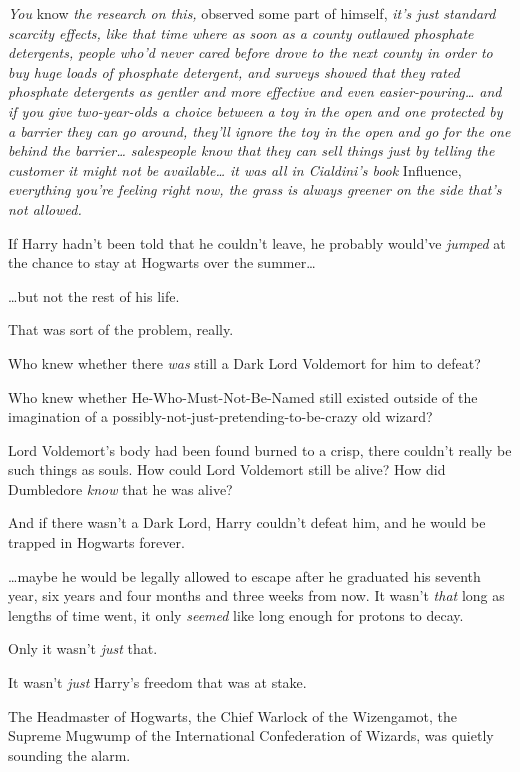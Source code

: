 \emph{You} know \emph{the research on this,} observed some part of himself, 
\emph{it's just standard scarcity effects, like that time where as soon as a 
county outlawed phosphate detergents, people who'd never cared before drove to 
the next county in order to buy huge loads of phosphate detergent, and surveys 
showed that they rated phosphate detergents as gentler and more effective and 
even easier-pouring{\ldots} and if you give two-year-olds a choice between a 
toy in the open and one protected by a barrier they can go around, they'll 
ignore the toy in the open and go for the one behind the barrier{\ldots} 
salespeople know that they can sell things just by telling the customer it 
might not be available{\ldots} it was all in Cialdini's book} Influence, \emph{
everything you're feeling right now, the grass is always greener on the side 
that's not allowed.}

If Harry hadn't been told that he couldn't leave, he probably would've 
\emph{jumped} at the chance to stay at Hogwarts over the summer{\ldots}

{\ldots}but not the rest of his life.

That was sort of the problem, really.

Who knew whether there \emph{was} still a Dark Lord Voldemort for him to defeat?

Who knew whether He-Who-Must-Not-Be-Named still existed outside of the 
imagination of a possibly-not-just-pretending-to-be-crazy old wizard?

Lord Voldemort's body had been found burned to a crisp, there couldn't really 
be such things as souls. How could Lord Voldemort still be alive? How did 
Dumbledore \emph{know} that he was alive?

And if there wasn't a Dark Lord, Harry couldn't defeat him, and he would be 
trapped in Hogwarts forever.

{\ldots}maybe he would be legally allowed to escape after he graduated his 
seventh year, six years and four months and three weeks from now. It wasn't 
\emph{that} long as lengths of time went, it only \emph{seemed} like long 
enough for protons to decay.

Only it wasn't \emph{just} that.

It wasn't \emph{just} Harry's freedom that was at stake.

The Headmaster of Hogwarts, the Chief Warlock of the Wizengamot, the Supreme 
Mugwump of the International Confederation of Wizards, was quietly sounding the 
alarm.

